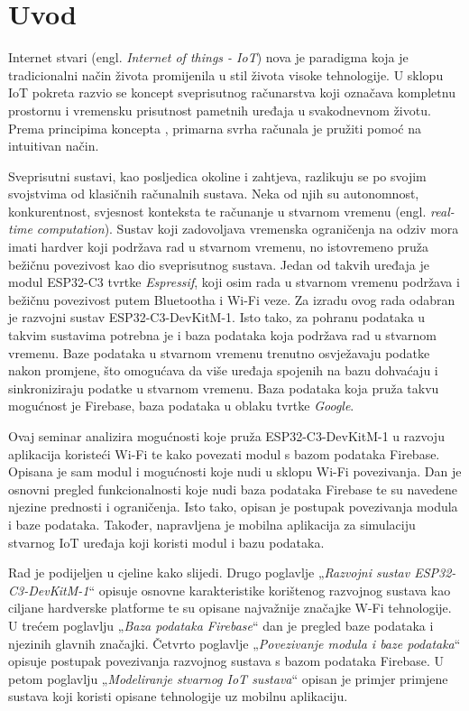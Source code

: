 \chapter{Uvod}

Internet stvari (engl. \textit{Internet of things - IoT}) nova je paradigma koja je tradicionalni način života promijenila u stil života visoke tehnologije. U sklopu IoT pokreta razvio se koncept sveprisutnog računarstva koji označava kompletnu prostornu i vremensku prisutnost pametnih uređaja u svakodnevnom životu. Prema principima koncepta \cite{sverac}, primarna svrha računala je pružiti pomoć na intuitivan način. 

Sveprisutni sustavi, kao posljedica okoline i zahtjeva, razlikuju se po svojim svojstvima od klasičnih računalnih sustava. Neka od njih su autonomnost, konkurentnost, svjesnost konteksta te računanje u stvarnom vremenu (engl. \textit{real-time computation}). Sustav koji zadovoljava vremenska ograničenja na odziv mora imati hardver koji podržava rad u stvarnom vremenu, no istovremeno pruža bežičnu povezivost kao dio sveprisutnog sustava. Jedan od takvih uređaja je modul ESP32-C3 tvrtke \textit{Espressif}, koji osim rada u stvarnom vremenu podržava i bežičnu povezivost putem Bluetootha i Wi-Fi veze. Za izradu ovog rada odabran je razvojni sustav ESP32-C3-DevKitM-1. Isto tako, za pohranu podataka u takvim sustavima potrebna je i baza podataka koja podržava rad u stvarnom vremenu. Baze podataka u stvarnom vremenu trenutno osvježavaju podatke nakon promjene, što omogućava da više uređaja spojenih na bazu dohvaćaju i sinkroniziraju podatke u stvarnom vremenu. Baza podataka koja pruža takvu mogućnost je Firebase, baza podataka u oblaku tvrtke \textit{Google}.

Ovaj seminar analizira mogućnosti koje pruža ESP32-C3-DevKitM-1 u razvoju aplikacija koristeći Wi-Fi te kako povezati modul s bazom podataka Firebase. Opisana je sam modul i mogućnosti koje nudi u sklopu Wi-Fi povezivanja. Dan je osnovni pregled funkcionalnosti koje nudi baza podataka Firebase te su navedene njezine prednosti i ograničenja. Isto tako, opisan je postupak povezivanja modula i baze podataka. Također, napravljena je mobilna aplikacija za simulaciju stvarnog IoT uređaja koji koristi modul i bazu podataka.

Rad je podijeljen u cjeline kako slijedi. Drugo poglavlje „\textit{Razvojni sustav ESP32-C3-DevKitM-1}“ opisuje osnovne karakteristike korištenog razvojnog sustava kao ciljane hardverske platforme te su opisane najvažnije značajke W-Fi tehnologije. U trećem poglavlju „\textit{Baza podataka Firebase}“ dan je pregled baze podataka i njezinih glavnih značajki. Četvrto poglavlje „\textit{Povezivanje modula i baze podataka}“  opisuje postupak povezivanja razvojnog sustava s bazom podataka Firebase. U petom poglavlju „\textit{Modeliranje stvarnog IoT sustava}“ opisan je primjer primjene sustava koji koristi opisane tehnologije uz mobilnu aplikaciju.

\eject